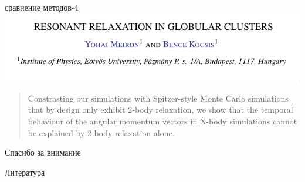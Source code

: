 \documentclass{beamer}
\begin{document}
    \begin{frame}{сравнение методов-4}
      \includegraphics[width=0.9\linewidth]{img/mcwrong1}
      \vfill
      \begin{quote}
        Constrasting our simulations with Spitzer-style Monte
        Carlo simulations that by design only exhibit 2-body
        relaxation, we show that the temporal behaviour of 
        the angular momentum vectors in N-body simulations cannot
        be explained by 2-body relaxation alone.
      \end{quote}
    \end{frame}
    
    \begin{frame}[focus]
        Спасибо за внимание
    \end{frame}
    
    \appendix
    \begin{frame}{Литература}
        \nocite{*}
        
        
    \end{frame}
\end{document}
